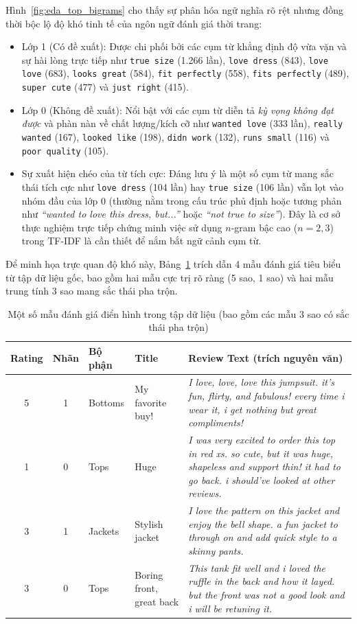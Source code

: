 Hình~\ref{fig:eda_top_bigrams} cho thấy sự phân hóa ngữ nghĩa rõ rệt nhưng đồng thời bộc lộ độ khó tinh tế của ngôn ngữ đánh giá thời trang:
\begin{itemize}
    \item Lớp 1 (Có đề xuất): Được chi phối bởi các cụm từ khẳng định độ vừa vặn và sự hài lòng trực tiếp như \texttt{true size} (1.266 lần), \texttt{love dress} (843), \texttt{love love} (683), \texttt{looks great} (584), \texttt{fit perfectly} (558), \texttt{fits perfectly} (489), \texttt{super cute} (477) và \texttt{just right} (415).
    \item Lớp 0 (Không đề xuất): Nổi bật với các cụm từ diễn tả \textit{kỳ vọng không đạt được} và phàn nàn về chất lượng/kích cỡ như \texttt{wanted love} (333 lần), \texttt{really wanted} (167), \texttt{looked like} (198), \texttt{didn work} (132), \texttt{runs small} (116) và \texttt{poor quality} (105).
    \item Sự xuất hiện chéo của từ tích cực: Đáng lưu ý là một số cụm từ mang sắc thái tích cực như \texttt{love dress} (104 lần) hay \texttt{true size} (106 lần) vẫn lọt vào nhóm đầu của lớp 0 (thường nằm trong cấu trúc phủ định hoặc tương phản như \textit{``wanted to love this dress, but...''} hoặc \textit{``not true to size''}). Đây là cơ sở thực nghiệm trực tiếp chứng minh việc sử dụng $n$-gram bậc cao ($n = 2, 3$) trong TF-IDF là cần thiết để nắm bắt ngữ cảnh cụm từ.
\end{itemize}

Để minh họa trực quan độ khó này, Bảng~\ref{tab:sample_reviews} trích dẫn 4 mẫu đánh giá tiêu biểu từ tập dữ liệu gốc, bao gồm hai mẫu cực trị rõ ràng (5 sao, 1 sao) và hai mẫu trung tính 3 sao mang sắc thái pha trộn.

\begin{table}[H]
\centering
\small
\renewcommand{\arraystretch}{1.2}
\begin{tabularx}{\textwidth}{|c|c|l|l|X|}
\hline
\textbf{Rating} & \textbf{Nhãn} & \textbf{Bộ phận} & \textbf{Title} & \textbf{Review Text (trích nguyên văn)} \\ \hline
5 & 1 & Bottoms & My favorite buy! & \textit{I love, love, love this jumpsuit. it's fun, flirty, and fabulous! every time i wear it, i get nothing but great compliments!} \\ \hline
1 & 0 & Tops & Huge & \textit{I was very excited to order this top in red xs. so cute, but it was huge, shapeless and support thin! it had to go back. i should've looked at other reviews.} \\ \hline
3 & 1 & Jackets & Stylish jacket & \textit{I love the pattern on this jacket and enjoy the bell shape. a fun jacket to through on and add quick style to a skinny pants.} \\ \hline
3 & 0 & Tops & Boring front, great back & \textit{This tank fit well and i loved the ruffle in the back and how it layed. but the front was not a good look and i will be retuning it.} \\ \hline
\end{tabularx}
\caption{Một số mẫu đánh giá điển hình trong tập dữ liệu (bao gồm các mẫu 3 sao có sắc thái pha trộn)}
\label{tab:sample_reviews}
\end{table}

